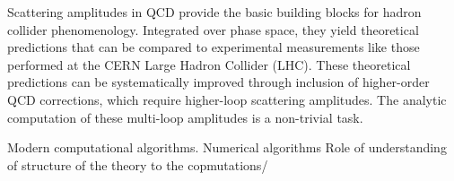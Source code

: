 
Scattering amplitudes in QCD provide the basic building blocks for hadron
collider phenomenology. Integrated over phase space, they yield theoretical
predictions that can be compared to experimental measurements like those
performed at the CERN Large Hadron Collider (LHC). These theoretical
predictions can be systematically improved through inclusion of higher-order
QCD corrections, which require higher-loop scattering amplitudes.  The analytic
computation of these multi-loop amplitudes is a non-trivial task.

Modern computational algorithms.
Numerical algorithms
Role of understanding of structure of the theory to the copmutations/
